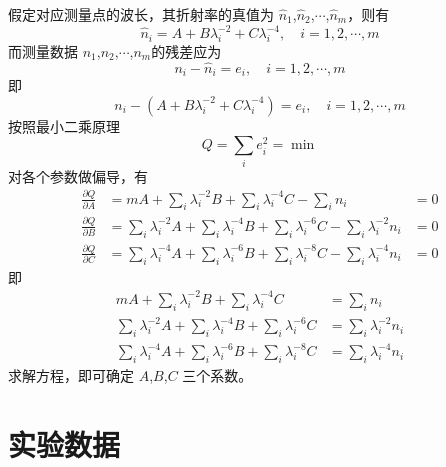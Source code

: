 \documentclass[12pt]{article}
\begin{document}
假定对应测量点的波长，其折射率的真值为 $\hat n_1$,$\hat n_2$,$\cdots$,$\hat n_m$，则有
\begin{equation}
    \hat n_i=A+B\lambda_i^{-2}+C\lambda_i^{-4},\quad i=1,2,\cdots,m
\end{equation}
而测量数据 $n_1$,$n_2$,$\cdots$,$n_m$的残差应为
\begin{equation}
    n_i-\hat n_i=e_i,\quad i=1,2,\cdots,m
\end{equation}
即
\begin{equation}
    n_i-(A+B\lambda_i^{-2}+C\lambda_i^{-4})=e_i,\quad i=1,2,\cdots,m 
\end{equation}
按照最小二乘原理
\begin{equation}
    Q=\sum_ie_i^2=\min
\end{equation}
对各个参数做偏导，有
\begin{equation}
    \begin{aligned}
        \frac{\partial Q}{\partial A}&= mA+\sum_i \lambda_i^{-2}B+\sum_i \lambda_i^{-4}C-\sum_i n_i &=0\\
        \frac{\partial Q}{\partial B}&= \sum_i \lambda_i^{-2}A +\sum_i \lambda_i^{-4}B+\sum_i \lambda_i^{-6}C-\sum_i \lambda_i^{-2} n_i &=0\\
        \frac{\partial Q}{\partial C}&= \sum_i \lambda_i^{-4}A +\sum_i \lambda_i^{-6}B+\sum_i \lambda_i^{-8}C-\sum_i \lambda_i^{-4} n_i &=0
    \end{aligned}
\end{equation}
即
\begin{equation}
    \begin{aligned}
        mA+\sum_i \lambda_i^{-2}B+\sum_i \lambda_i^{-4}C&=\sum_i n_i\\
        \sum_i \lambda_i^{-2}A +\sum_i \lambda_i^{-4}B+\sum_i \lambda_i^{-6}C&=\sum_i \lambda_i^{-2} n_i \\
        \sum_i \lambda_i^{-4}A +\sum_i \lambda_i^{-6}B+\sum_i \lambda_i^{-8}C&=\sum_i \lambda_i^{-4} n_i 
    \end{aligned}
\end{equation}
求解方程，即可确定 $A$,$B$,$C$ 三个系数。

\section{实验数据}
\end{document}
